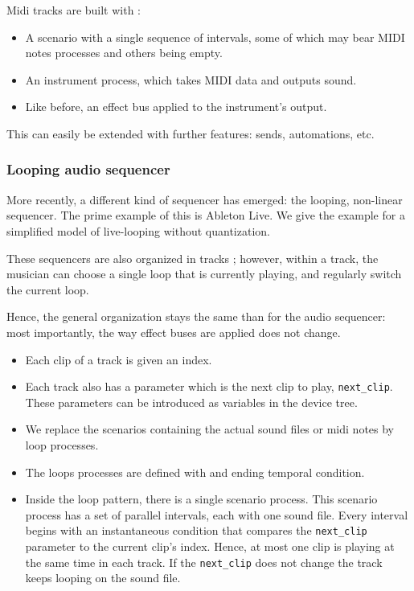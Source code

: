 \documentclass{article}
\begin{document}
Midi tracks are built with : 
\begin{itemize}
    \item A scenario with a single sequence of intervals, some of which may bear MIDI notes processes and others being empty.
    \item An instrument process, which takes MIDI data and outputs sound.
    \item Like before, an effect bus applied to the instrument's output.
\end{itemize}

This can easily be extended with further features: sends, automations, etc.
\subsubsection{Looping audio sequencer}
More recently, a different kind of sequencer has emerged: the looping, non-linear sequencer. 
The prime example of this is Ableton Live. We give the example for a simplified model of live-looping without quantization.

These sequencers are also organized in tracks ; however, within a track, the musician can choose a single loop 
that is currently playing, and regularly switch the current loop.

Hence, the general organization stays the same than for the audio sequencer: most importantly, the way effect buses are applied does not change.

\begin{itemize}
    \item Each clip of a track is given an index. 
    \item Each track also has a parameter which is the next clip to play, \lstinline|next_clip|. These parameters can be introduced as variables in the device tree.
    \item We replace the scenarios containing the actual sound files or midi notes by loop processes. 
    \item The loops processes are defined with and ending temporal condition. 
    \item Inside the loop pattern, there is a single scenario process. This scenario process has a set of parallel intervals, each with one sound file. Every interval begins with an instantaneous condition that compares the \lstinline|next_clip| parameter to the current clip's index. Hence, at most one clip is playing at the same time in each track. If the \lstinline|next_clip| does not change the track keeps looping on the sound file.
\end{itemize}
\end{document}
